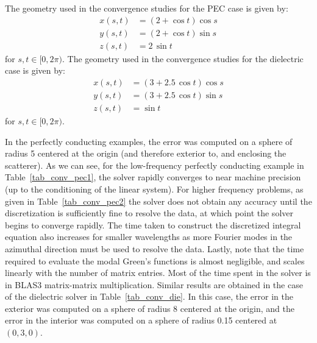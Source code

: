 \documentclass[11pt]{article}
\numberwithin{equation}{section}
\begin{document}
The geometry used in the convergence studies for the PEC case is given
by:
\begin{equation}
  \begin{aligned}
    x(s,t) &= \left( 2 + \cos t \right) \cos s \\
    y(s,t) &= \left( 2 + \cos t \right) \sin s\\
    z(s,t) &= 2\, \sin t 
  \end{aligned}
\end{equation}
for $s,t \in [0,2\pi)$.
The geometry used in the convergence studies for the dielectric case is given
by:
\begin{equation}
  \begin{aligned}
    x(s,t) &= \left( 3 + 2.5 \, \cos t \right) \cos s\\
    y(s,t) &= \left( 3 + 2.5 \, \cos t \right) \sin s\\
    z(s,t) &= \sin t
  \end{aligned}
\end{equation}
for $s,t \in [0,2\pi)$.
 


In the perfectly conducting examples, the error was computed on a
sphere of radius 5 centered at the origin (and therefore exterior to, and
enclosing the scatterer).
As we can see, for the low-frequency perfectly conducting 
example in Table~\ref{tab_conv_pec1}, the solver rapidly 
converges to
near machine precision (up to the conditioning of the linear
system). For higher frequency problems, as given in
Table~\ref{tab_conv_pec2}
 the solver does not obtain any
accuracy until the discretization is sufficiently
fine to resolve the data, at which point the solver begins to converge
rapidly. The time taken to construct the discretized
integral equation also increases for smaller wavelengths as  more Fourier
modes in the azimuthal direction must be used to resolve the
data. Lastly, note that the time required to evaluate the modal
Green's functions is almost negligible, and scales linearly with the
number of matrix entries. Most of the time spent in the
solver is in BLAS3 matrix-matrix multiplication.
Similar results are obtained in the case of the dielectric solver in
Table~\ref{tab_conv_die}. In this case, 
the error in the exterior was computed on a
sphere of radius 8 centered at the origin, and the error in the
interior was computed on a sphere of radius 0.15 centered at $(0,3,0)$.
\end{document}
